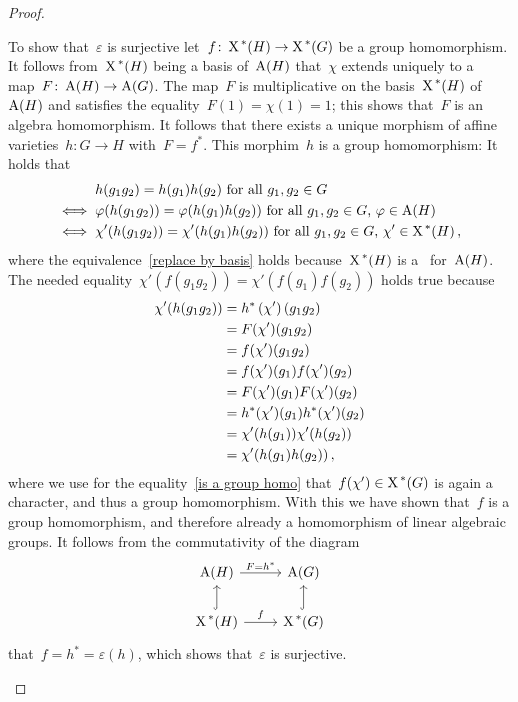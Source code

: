 \begin{proof}
\begin{enumerate}[label = Step~\arabic*]
      To show that~$\varepsilon$ is surjective let~$f \colon \operatorname{X}^{\,*}(H) \to \operatorname{X}^{\,*}(G)$ be a group homomorphism.
      It follows from~$\operatorname{X}^{\,*}(H)$ being a basis of~$\operatorname{A}(H)$ that~$\chi$ extends uniquely to a~ map~$F \colon \operatorname{A}(H) \to \operatorname{A}(G)$.
      The map~$F$ is multiplicative on the basis~$\operatorname{X}^{\,*}(H)$ of~$\operatorname{A}(H)$ and satisfies the equality~$F(1) = \chi(1) = 1$;
      this shows that~$F$ is an algebra homomorphism.
      It follows that there exists a unique morphism of affine varieties~$h \colon G \to H$ with~$F = f^*$.
      This morphim~$h$ is a group homomorphism:
      It holds that
      \begin{align}
            & \text{$h(g_1 g_2) = h(g_1) h(g_2)$ for all~$g_1, g_2 \in G$}  \notag  \\
      \iff{}& \text{$\varphi(h(g_1 g_2)) = \varphi( h(g_1) h(g_2) )$ for all~$g_1, g_2 \in G$,~$\varphi \in \operatorname{A}(H)$} \notag  \\
      \iff{}& \text{$\chi'(h(g_1 g_2)) = \chi'(h(g_1) h(g_2))$ for all~$g_1, g_2 \in G$,~$\chi' \in \operatorname{X}^{\,*}(H)$}
      \label{replace by basis}
      \,,
      \end{align}
      where the equivalence~\eqref{replace by basis} holds because~$\operatorname{X}^{\,*}(H)$ is a~ for~$\operatorname{A}(H)$.
      The needed equality~$\chi'(f(g_1 g_2)) = \chi'(f(g_1) f(g_2))$ holds true because
      \begin{align}
            \chi'(h(g_1 g_2)) \notag
        &=  h^*\left( \chi' \right)(g_1 g_2) \notag \\
        &=  F(\chi')(g_1 g_2) \notag  \\
        &=  f(\chi')(g_1 g_2) \notag  \\
        &=  f(\chi')(g_1) f(\chi')(g_2) \label{is a group homo}  \\
        &=  F(\chi')(g_1) F(\chi')(g_2) \notag  \\
        &=  h^*(\chi')(g_1) h^*(\chi')(g_2) \notag  \\
        &=  \chi'(h(g_1)) \chi'(h(g_2)) \notag  \\
        &=  \chi'(h(g_1) h(g_2)) \notag \,,
      \end{align}
      where we use for the equality~\eqref{is a group homo} that~$f(\chi') \in \operatorname{X}^{\,*}(G)$ is again a character, and thus a group homomorphism.
      With this we have shown that~$f$ is a group homomorphism, and therefore already a homomorphism of linear algebraic groups.
      It follows from the commutativity of the diagram
      \[
        \begin{tikzcd}
            \coord(H)
            \arrow{r}[above]{F = h^*}
          & \coord(G)
          \\
            \chargroup(H)
            \arrow{r}[above]{f}
            \arrow[hook]{u}
          & \chargroup(G)
            \arrow[hook]{u}
        \end{tikzcd}
      \]
      that~$f = h^* = \varepsilon(h)$, which shows that~$\varepsilon$ is surjective.
      

\end{enumerate}
\end{proof}
